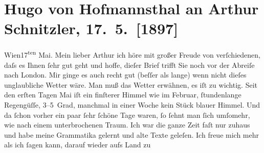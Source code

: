 

         
         \renewcommand{\erwaehntePersonen}{Personen: Otto Brahm, Georg Hirschfeld, Hugo von Hofmannsthal}
         \renewcommand{\erwaehnteOrte}{Orte: Dornbach, London, Neuwaldegg, Paris, Wien}
         \renewcommand{\erwaehnteWerke}{}
               \section[Hugo von Hofmannsthal an Arthur Schnitzler, 17. 5. {[}1897{]}]{ Hugo von Hofmannsthal an Arthur Schnitzler, 17. 5. {[}1897{]}}\nopagebreak{}\rehead{ }\begin{ledgroupsized}[t]{13cm}\normalsize\beginnumbering{} \toendnotes[C]{\smallbreak\pagebreak[2]} 
\pstart
           \raggedleft{}{\pb}Wien17\textsuperscript{ten} Mai.\pend
           \pstart{}Mein lieber Arthur\pend\pstart
           ich höre mit großer Freude von verſchiedenen, daſs es Ihnen ſehr gut  geht und hoffe, dieſer Brief trifft Sie noch vor der
               Abreiſe nach London. Mir ginge es auch recht gut
               (beſſer als lange) wenn nicht dieſes unglaubliche Wetter wäre. Man muß das Wetter
               erwähnen, es iſt {\pb}zu wichtig. Seit
               den erſten Tagen Mai iſt ein finſterer Himmel wie im Februar,
               ſtundenlange Regengüſſe, 3–5 Grad, manchmal in einer Woche kein Stück blauer Himmel.
               Und da ſchon vorher ein paar ſehr ſchöne Tage waren, ſo ſehnt man ſich umſomehr, wie
               nach einem unterbrochenen Traum. Ich war die ganze Zeit faſt nur zuhaus und habe
               meine Grammatika gelernt {\pb}und alte
               Texte geleſen. Ich freue mich mehr als ich ſagen kann, darauf wieder aufs Land zu

\end{ledgroupsized}
